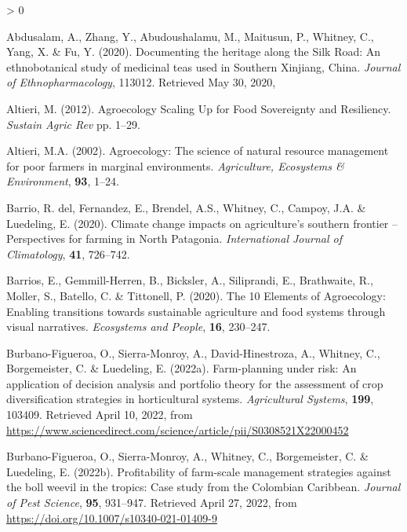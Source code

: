 \documentclass[
]{article}
\newlength{\cslhangindent}
\newenvironment{CSLReferences}[2] %
 {%
  \setlength{\parindent}{0pt}
  \ifodd #1 \everypar{\setlength{\hangindent}{\cslhangindent}}\ignorespaces\fi
  \ifnum #2 > 0
  \setlength{\parskip}{#2\baselineskip}
  \fi
 }%
 {}
\begin{document}
\hypertarget{refs}{}
\begin{CSLReferences}{1}{0}
\leavevmode{}%
Abdusalam, A., Zhang, Y., Abudoushalamu, M., Maitusun, P., Whitney, C.,
Yang, X. \& Fu, Y. (2020). Documenting the heritage along the {Silk}
{Road}: {An} ethnobotanical study of medicinal teas used in {Southern}
{Xinjiang}, {China}. \emph{Journal of Ethnopharmacology}, 113012.
Retrieved May 30, 2020,

\leavevmode{}%
Altieri, M. (2012). Agroecology {Scaling} {Up} for {Food} {Sovereignty}
and {Resiliency}. \emph{Sustain {Agric} {Rev}} pp. 1--29.

\leavevmode{}%
Altieri, M.A. (2002). Agroecology: The science of natural resource
management for poor farmers in marginal environments. \emph{Agriculture,
Ecosystems \& Environment}, \textbf{93}, 1--24.

\leavevmode{}%
Barrio, R. del, Fernandez, E., Brendel, A.S., Whitney, C., Campoy, J.A.
\& Luedeling, E. (2020). Climate change impacts on agriculture's
southern frontier -- {Perspectives} for farming in {North} {Patagonia}.
\emph{International Journal of Climatology}, \textbf{41}, 726--742.

\leavevmode{}%
Barrios, E., Gemmill-Herren, B., Bicksler, A., Siliprandi, E.,
Brathwaite, R., Moller, S., Batello, C. \& Tittonell, P. (2020). The 10
{Elements} of {Agroecology}: Enabling transitions towards sustainable
agriculture and food systems through visual narratives. \emph{Ecosystems
and People}, \textbf{16}, 230--247.

\leavevmode{}%
Burbano-Figueroa, O., Sierra-Monroy, A., David-Hinestroza, A., Whitney,
C., Borgemeister, C. \& Luedeling, E. (2022a). Farm-planning under risk:
{An} application of decision analysis and portfolio theory for the
assessment of crop diversification strategies in horticultural systems.
\emph{Agricultural Systems}, \textbf{199}, 103409. Retrieved April 10,
2022, from
\url{https://www.sciencedirect.com/science/article/pii/S0308521X22000452}

\leavevmode{}%
Burbano-Figueroa, O., Sierra-Monroy, A., Whitney, C., Borgemeister, C.
\& Luedeling, E. (2022b). Profitability of farm-scale management
strategies against the boll weevil in the tropics: Case study from the
{Colombian} {Caribbean}. \emph{Journal of Pest Science}, \textbf{95},
931--947. Retrieved April 27, 2022, from
\url{https://doi.org/10.1007/s10340-021-01409-9}


\end{CSLReferences}
\end{document}
